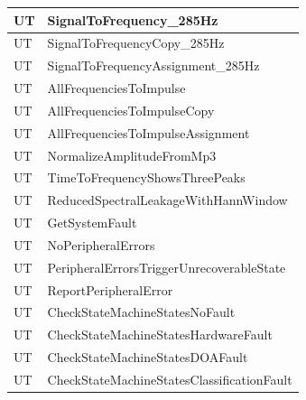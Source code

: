\documentclass[12pt, titlepage]{article}
\newcounter{unitTest}
\newcommand{\mtheunitTest}{UT\theunitTest}
\begin{document}
{\begin{longtable}{|p{2cm}|p{11cm}|}
    {unitTest} \mtheunitTest \label{SignalToFrequency_285Hz} &
    SignalToFrequency\_285Hz \\ \hline
    {unitTest} \mtheunitTest \label{SignalToFrequencyCopy_285Hz}
    & SignalToFrequencyCopy\_285Hz \\ \hline
    {unitTest} \mtheunitTest
    \label{SignalToFrequencyAssignment_285Hz} &
    SignalToFrequencyAssignment\_285Hz \\ \hline
    {unitTest} \mtheunitTest \label{AllFrequenciesToImpulse} &
    AllFrequenciesToImpulse \\ \hline
    {unitTest} \mtheunitTest \label{AllFrequenciesToImpulseCopy}
    & AllFrequenciesToImpulseCopy \\ \hline
    {unitTest} \mtheunitTest
    \label{AllFrequenciesToImpulseAssignment} &
    AllFrequenciesToImpulseAssignment \\ \hline

    {unitTest} \mtheunitTest \label{NormalizeAmplitudeFromMp3} &
    NormalizeAmplitudeFromMp3 \\ \hline
    {unitTest} \mtheunitTest
    \label{TimeToFrequencyShowsThreePeaks} & TimeToFrequencyShowsThreePeaks \\
    \hline
    {unitTest} \mtheunitTest
    \label{ReducedSpectralLeakageWithHannWindow} &
    ReducedSpectralLeakageWithHannWindow \\ \hline

    {unitTest} \mtheunitTest \label{GetSystemFault} &
    GetSystemFault \\ \hline
    {unitTest} \mtheunitTest \label{NoPeripheralErrors} &
    NoPeripheralErrors \\ \hline
    {unitTest} \mtheunitTest
    \label{PeripheralErrorsTriggerUnrecoverableState} &
    PeripheralErrorsTriggerUnrecoverableState \\ \hline
    {unitTest} \mtheunitTest \label{ReportPeripheralError} &
    ReportPeripheralError \\ \hline
    {unitTest} \mtheunitTest
    \label{CheckStateMachineStatesNoFault} & CheckStateMachineStatesNoFault \\
    \hline
    {unitTest} \mtheunitTest
    \label{CheckStateMachineStatesHardwareFault} &
    CheckStateMachineStatesHardwareFault \\ \hline
    {unitTest} \mtheunitTest
    \label{CheckStateMachineStatesDOAFault} & CheckStateMachineStatesDOAFault \\
    \hline
    {unitTest} \mtheunitTest
    \label{CheckStateMachineStatesClassificationFault} &
    CheckStateMachineStatesClassificationFault \\ \hline


\end{longtable}}
\end{document}
